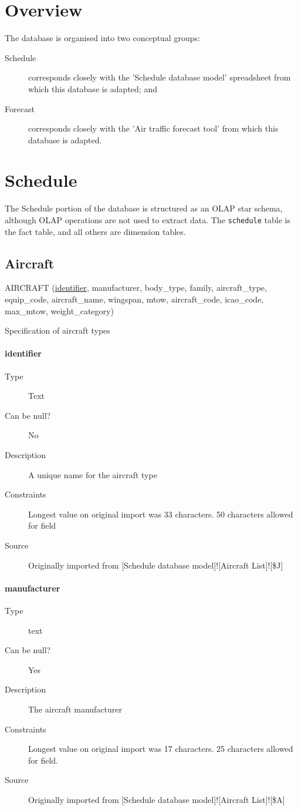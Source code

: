 \documentclass[]{report}
\begin{document}
\section{Overview}
The database is organised into two conceptual groups:\begin{description}
\item[Schedule]corresponds closely with the 'Schedule database model' spreadsheet from which this database is adapted; and
\item[Forecast] corresponds closely with the 'Air traffic forecast tool' from which this database is adapted.
\end{description}
\section{Schedule}
The Schedule portion of the database is structured as an OLAP star schema, although OLAP operations are not used to extract data. The \verb|schedule| table is the fact table, and all others are dimension tables.
\subsection{Aircraft}
AIRCRAFT (\underline{identifier}, manufacturer, body\_type, family, aircraft\_type, equip\_code, aircraft\_name, wingspan,
mtow, aircraft\_code, icao\_code, max\_mtow, weight\_category)

Specification of aircraft types

\paragraph{identifier}
	\begin{description}
	\item[Type]Text
	\item[Can be null?]No
	\item[Description]A unique name for the aircraft type
	\item[Constraints]Longest value on original import was 33 characters. 50 characters allowed for field
	\item[Source]Originally imported from [Schedule database model]![Aircraft List]![\$J]
	\end{description}
\paragraph{manufacturer}
	\begin{description}
	\item[Type]text
	\item[Can be null?]Yes
	\item[Description]The aircraft manufacturer
	\item[Constraints]Longest value on original import was 17 characters. 25 characters allowed for field.
	\item[Source]Originally imported from [Schedule database model]![Aircraft List]![\$A]
	\end{description}
\end{document}
